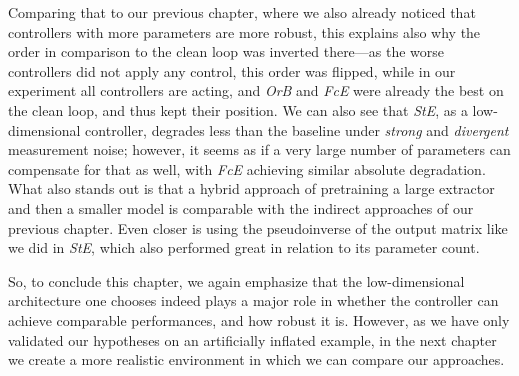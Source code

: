 Comparing that to our previous chapter, where we also already noticed that controllers with more parameters are more robust, this explains also
why the order in comparison to the clean loop was inverted there---as the worse controllers did not apply any control, this order was flipped, while
in our experiment all controllers are acting, and \emph{OrB} and \emph{FcE} were already the best on the clean loop, and thus kept their position.
We can also see that \emph{StE}, as a low-dimensional controller, degrades less than the baseline under \emph{strong} and \emph{divergent} measurement noise;
however, it seems as if a very large number of parameters can compensate for that as well, with \emph{FcE} achieving similar absolute degradation.
What also stands out is that a hybrid approach of pretraining a large extractor and then a smaller model is comparable with the indirect
approaches of our previous chapter. Even closer is using the pseudoinverse of the output matrix like we did in \emph{StE}, which also
performed great in relation to its parameter count.

So, to conclude this chapter, we again emphasize that the low-dimensional architecture one chooses indeed plays a major
role in whether the controller can achieve comparable performances, and how robust it is. However, as we have only validated
our hypotheses on an artificially inflated example, in the next chapter we create a more realistic environment in
which we can compare our approaches.
